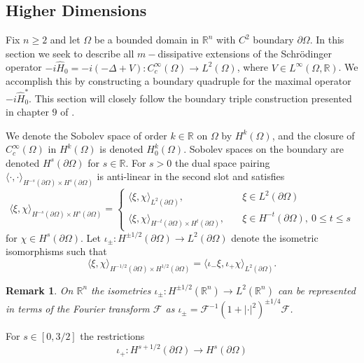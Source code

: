 \documentclass{article}
\numberwithin{equation}{section}
\newtheorem{remark}{Remark}[section]
\begin{document}
\subsection{Higher Dimensions}
Fix $n \geq 2$ and let $\Omega$ be a bounded domain in $\mathbb{R}^n$ with $C^2$ boundary $\partial \Omega$. In this section we seek to describe all $m-$dissipative extensions of the Schr\"odinger operator $-i\hat{H}_0=-i(-\Delta + V):C_c^\infty(\Omega)\to L^2(\Omega)$, where $V\in L^\infty(\Omega,\mathbb{R})$. We accomplish this by constructing a boundary quadruple for the maximal operator $-i \hat{H}_0^*$. This section will closely follow the boundary triple construction presented in chapter $9$ of \cite{BHS2020}.
\par
We denote the Sobolev space of order $k\in \mathbb{R}$ on $\Omega$ by $H^k(\Omega)$, and the closure of $C_c^\infty(\Omega)$ in $H^k(\Omega)$ is denoted $H_0^k(\Omega)$. Sobolev spaces on the boundary are denoted $H^s(\partial \Omega)$ for $s \in  \mathbb{R}$. For $s>0$ the dual space pairing $\langle \cdot, \cdot \rangle_{H^{-s}(\partial \Omega)\times H^s(\partial \Omega)}$ is anti-linear in the second slot and satisfies
\begin{equation}
    \langle \xi, \chi \rangle_{H^{-s}(\partial \Omega)\times H^s(\partial \Omega)}=\begin{cases} \langle \xi, \chi\rangle_{L^2(\partial \Omega)}, \quad & \xi \in L^2(\partial \Omega)
    \\
    \langle \xi, \chi\rangle_{H^{-t}(\partial \Omega)\times H^{t}(\partial \Omega)}, \quad & \xi \in H^{-t}(\partial \Omega), ~0 \leq t\leq s
    \end{cases}
\end{equation} for $\chi \in H^s(\partial \Omega)$. Let $\iota_\pm:H^{\pm 1/2}(\partial \Omega) \to L^2(\partial \Omega)$ denote the isometric isomorphisms such that
\begin{equation}
    \langle \xi, \chi \rangle_{H^{-1/2}(\partial \Omega)\times H^{1/2}(\partial \Omega)}= \langle \iota_- \xi, \iota_+ \chi\rangle_{L^2(\partial \Omega)}.
\end{equation}
\begin{remark}
    On $\mathbb{R}^n$ the isometries $\iota_\pm:H^{\pm 1/2}(\mathbb{R}^n)\to L^2(\mathbb{R}^n)$ can be represented in terms of the Fourier transform $\mathcal{F}$ as $\iota_\pm=\mathcal{F}^{-1}(1+|\cdot|^2)^{\pm 1/4}\mathcal{F}$.
\end{remark}
For $s\in [0,3/2]$ the restrictions 
\begin{equation}
    \iota_+: H^{s+1/2}(\partial \Omega)\to H^s(\partial \Omega)
\end{equation}
\end{document}
